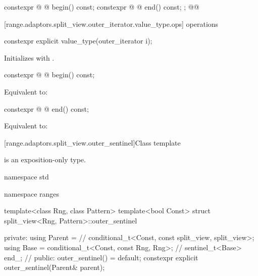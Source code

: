 {\begin{codeblock}
{{    constexpr @ @ begin() const;
    constexpr @ @ end() const;
  };
}@\oldtxt{\}}@
\end{codeblock}

[range.adaptors.split_view.outer_iterator.value_type.ops]{ operations}

%
\begin{itemdecl}
constexpr explicit value_type(outer_iterator i);
\end{itemdecl}

\begin{itemdescr}
\pnum
\effects Initializes  with .
\end{itemdescr}

%
\begin{itemdecl}
constexpr @ @ begin() const;
\end{itemdecl}

\begin{itemdescr}
\pnum
\effects Equivalent to: 
\end{itemdescr}

%
\begin{itemdecl}
constexpr @ @ end() const;
\end{itemdecl}

\begin{itemdescr}
\pnum
\effects Equivalent to: 
\end{itemdescr}

{\color{oldclr}
[range.adaptors.split_view.outer_sentinel]{Class template }

\pnum
\begin{note}
 is an exposition-only type.
\end{note}

\begin{codeblock}
namespace std { namespace ranges {
  template<class Rng, class Pattern>
  template<bool Const>
  struct split_view<Rng, Pattern>::outer_sentinel {
  private:
    using Parent =                                       // \expos
      conditional_t<Const, const split_view, split_view>;
    using Base   = conditional_t<Const, const Rng, Rng>; // \expos
    sentinel_t<Base> end_;                               // \expos
  public:
    outer_sentinel() = default;
    constexpr explicit outer_sentinel(Parent& parent);

}}}
\end{codeblock}}}
